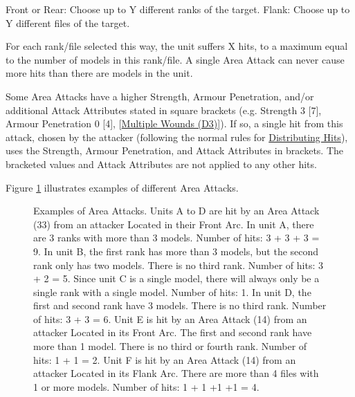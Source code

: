Front or Rear: Choose up to Y different ranks of the target.\newline
Flank: Choose up to Y different files of the target.

For each rank/file selected this way, the unit suffers X hits, to a maximum equal to the number of models in this rank/file. A single Area Attack can never cause more hits than there are models in the unit.

Some Area Attacks have a higher Strength, Armour Penetration, and/or additional Attack Attributes stated in square brackets (e.g. Strength 3 [7], Armour Penetration 0 [4], [\hyperref[multiple_wounds]{Multiple Wounds (D3)}]). If so, a single hit from this attack, chosen by the attacker (following the normal rules for \hyperref[distributing_hits]{Distributing Hits}), uses the Strength, Armour Penetration, and Attack Attributes in brackets. The bracketed values and Attack Attributes are not applied to any other hits.

Figure \ref{figure/area_attack} illustrates examples of different Area Attacks.

\newcommand{\figAATotalA}{3 + 3 + 3 = 9 Hits}
\newcommand{\figAATotalB}{3 + 2 = 5 Hits}
\newcommand{\figAATotalC}{1 Hit}
\newcommand{\figAATotalD}{3 + 3 = 6 Hits}
\newcommand{\figAATotalE}{1 + 1 = 2 Hits}
\newcommand{\figAATotalF}{1 + 1 + 1 + 1 = 4 Hits}
\newcommand{\figAAAreaAttack}[1]{\areaattack{#1}}

\begin{figure}[!htbp]
\centering
\def\svgwidth{0.9\textwidth}

\caption{Examples of Area Attacks.\captionpar
Units A to D are hit by an Area Attack (3\timess{}3) from an attacker Located in their Front Arc.\captionpar
In unit A, there are 3 ranks with more than 3 models. Number of hits: 3 + 3 + 3 = 9.\captionpar
 In unit B, the first rank has more than 3 models, but the second rank only has two models. There is no third rank.\newline
Number of hits: 3 + 2 = 5.\captionpar
Since unit C is a single model, there will always only be a single rank with a single model. Number of hits: 1.\captionpar
In unit D, the first and second rank have 3 models. There is no third rank. Number of hits: 3 + 3 = 6.\captionpar
Unit E is hit by an Area Attack (1\timess{}4) from an attacker Located in its Front Arc. The first and second rank have more than 1 model. There is no third or fourth rank. Number of hits: 1 + 1 = 2.\captionpar
Unit F is hit by an Area Attack (1\timess{}4) from an attacker Located in its Flank Arc. There are more than 4 files with 1 or more models. Number of hits: 1 + 1 +1 +1 = 4.%
}
\label{figure/area_attack}
\end{figure}

